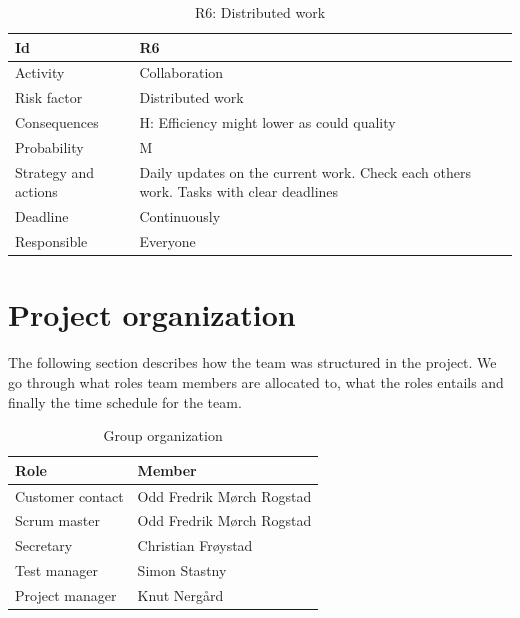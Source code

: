 \documentclass[11pt]{book}
\begin{document}
\begin{table}[H]
\centering
\begin{tabular}{ l  p{11cm} }
    Id                      & R6                                                                          \\ \hline
    Activity                & Collaboration                                                               \\ \hline
    Risk factor             & Distributed work                                                            \\ \hline
    Consequences            & H: Efficiency might lower as could quality                                  \\ \hline
    Probability             & M                                                                           \\ \hline
    Strategy and actions    & Daily updates on the current work. Check each others work. Tasks with 
                              clear deadlines                                                             \\ \hline
    Deadline                & Continuously                                                                \\ \hline
    Responsible             & Everyone                                                                    \\ 
\end{tabular}
\caption{R6: Distributed work}
\label{tab:risk_6}
\end{table}

\section{Project organization}
The following section describes how the team was structured in the project. We go through what roles team members are allocated to, what the roles entails and finally the time schedule for the team.

\begin{table}[H]
\centering
    \begin{tabular}{ l  p{11cm}  }
    Role                    & Member                                                                      \\ \hline
    Customer contact        & Odd Fredrik Mørch Rogstad                                                   \\ \hline
    Scrum master            & Odd Fredrik Mørch Rogstad                                                   \\ \hline
    Secretary               & Christian Frøystad                                                          \\ \hline
    Test manager            & Simon Stastny                                                               \\ \hline
    Project manager         & Knut Nergård                                                                \\
\end{tabular}
\caption{Group organization}
\label{tab:org}
\end{table}
\end{document}
